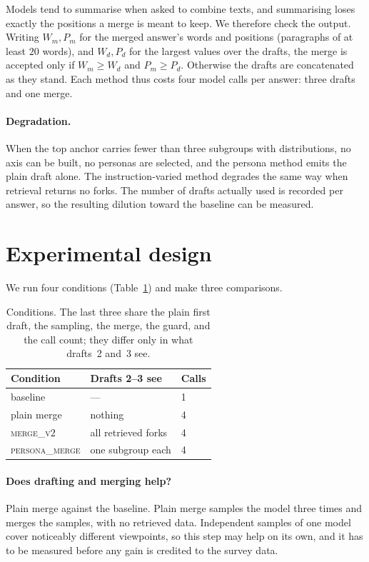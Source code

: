 \documentclass[11pt]{article}
\begin{document}
Models tend to summarise when asked to combine texts, and summarising loses
exactly the positions a merge is meant to keep. We therefore check the output.
Writing $W_m, P_m$ for the merged answer's words and positions (paragraphs of at
least $20$ words), and $W_d, P_d$ for the largest values over the drafts, the
merge is accepted only if $W_m \ge W_d$ and $P_m \ge P_d$. Otherwise the drafts
are concatenated as they stand. Each method thus costs four model calls per
answer: three drafts and one merge.

\paragraph{Degradation.} When the top anchor carries fewer than three subgroups
with distributions, no axis can be built, no personas are selected, and the
persona method emits the plain draft alone. The instruction-varied method
degrades the same way when retrieval returns no forks. The number of drafts
actually used is recorded per answer, so the resulting dilution toward the
baseline can be measured.

\section{Experimental design}

We run four conditions (Table~\ref{tab:conditions}) and make three comparisons.

\begin{table}[t]
\centering
\small
\begin{tabular}{lll}
\hline
Condition & Drafts 2--3 see & Calls \\
\hline
baseline                & ---                 & 1 \\
plain merge             & nothing             & 4 \\
\textsc{merge\_v2}      & all retrieved forks & 4 \\
\textsc{persona\_merge} & one subgroup each   & 4 \\
\hline
\end{tabular}
\caption{Conditions. The last three share the plain first draft, the sampling,
the merge, the guard, and the call count; they differ only in what drafts~2
and~3 see.}
\label{tab:conditions}
\end{table}

\paragraph{Does drafting and merging help?} Plain merge against the baseline.
Plain merge samples the model three times and merges the samples, with no
retrieved data. Independent samples of one model cover noticeably different
viewpoints, so this step may help on its own, and it has to be measured before
any gain is credited to the survey data.
\end{document}
